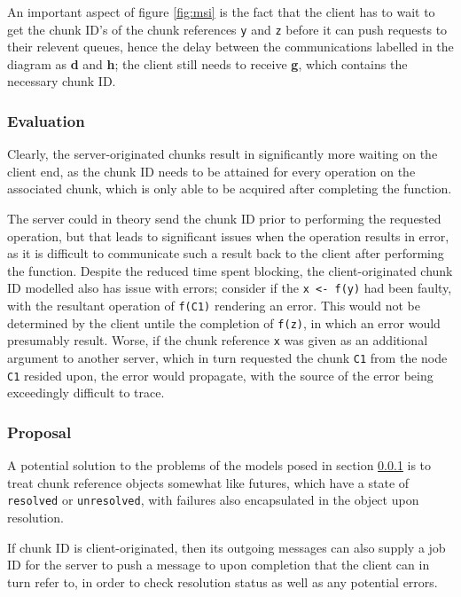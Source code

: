 An important aspect of figure \ref{fig:msi} is the fact that the client has to
wait to get the chunk ID's of the chunk references \texttt{y} and \texttt{z}
before it can push requests to their relevent queues, hence the delay between
the communications labelled in the diagram as \textcolor{dark2-3}{\textbf{d}}
and \textcolor{dark2-3}{\textbf{h}}; the client still needs to receive
\textcolor{dark2-1}{\textbf{g}}, which contains the necessary chunk ID.

\subsubsection{Evaluation}\label{sec:mod-eval}

Clearly, the server-originated chunks result in significantly more waiting on
the client end, as the chunk ID needs to be attained for every operation on the
associated chunk, which is only able to be acquired after completing the
function.

The server could in theory send the chunk ID prior to performing the requested
operation, but that leads to significant issues when the operation results in
error, as it is difficult to communicate such a result back to the client after
performing the function.
Despite the reduced time spent blocking, the client-originated chunk ID
modelled also has issue with errors; consider if the \texttt{x <- f(y)} had
been faulty, with the resultant operation of \texttt{f(C1)} rendering an error.
This would not be determined by the client untile the completion of
\texttt{f(z)}, in which an error would presumably result.
Worse, if the chunk reference \texttt{x} was given as an additional argument to
another server, which in turn requested the chunk \texttt{C1} from the node
\texttt{C1} resided upon, the error would propagate, with the source of the
error being exceedingly difficult to trace.

\subsubsection{Proposal}

A potential solution to the problems of the models posed in section
\ref{sec:mod-eval} is to treat chunk reference objects somewhat like futures,
which have a state of \texttt{resolved} or \texttt{unresolved}, with failures
also encapsulated in the object upon resolution\cite{bengtsson19:_futur_r}.

If chunk ID is client-originated, then its outgoing messages can also supply a
job ID for the server to push a message to upon completion that the client can
in turn refer to, in order to check resolution status as well as any potential
errors.

